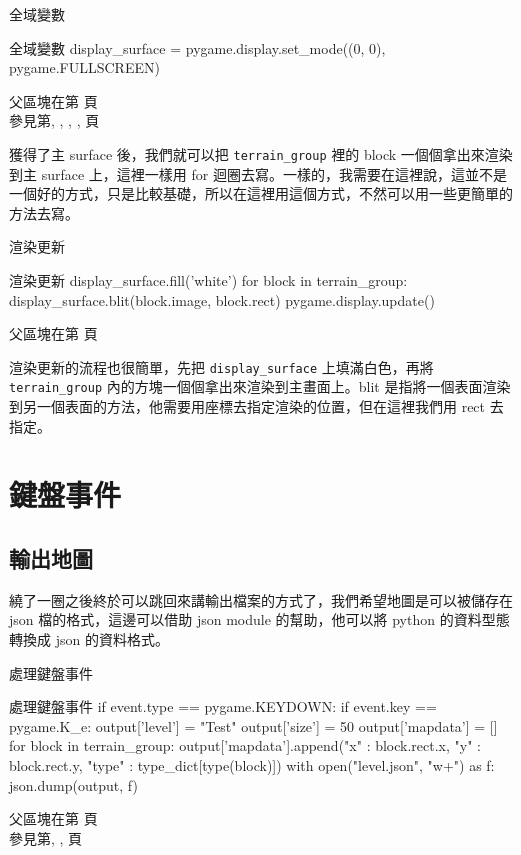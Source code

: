 \documentclass[12pt, a4paper]{siweb}
\begin{document}
\begin{siweb}{全域變數}
\begin{mylisting}{全域變數}
display_surface = pygame.display.set_mode((0, 0), pygame.FULLSCREEN)
\end{mylisting}
\label{全域變數_2}
父區塊在第\pageref{全域變數_father} 頁\\參見第\pageref{全域變數_0}, \pageref{全域變數_1}, \pageref{全域變數_2}, \pageref{全域變數_3}, 頁
\end{siweb}

獲得了主 surface 後，我們就可以把 \verb|terrain_group| 裡的 block 一個個拿出來渲染到主 surface 上，這裡一樣用 for 迴圈去寫。一樣的，我需要在這裡說，這並不是一個好的方式，只是比較基礎，所以在這裡用這個方式，不然可以用一些更簡單的方法去寫。

\begin{siweb}{渲染更新}
\begin{mylisting}{渲染更新}
display_surface.fill('white')
for block in terrain_group:
	display_surface.blit(block.image, block.rect)
pygame.display.update()
\end{mylisting}
\label{渲染更新_0}
父區塊在第\pageref{渲染更新_father} 頁
\end{siweb}

渲染更新的流程也很簡單，先把 \verb|display_surface| 上填滿白色，再將 \verb|terrain_group| 內的方塊一個個拿出來渲染到主畫面上。blit 是指將一個表面渲染到另一個表面的方法，他需要用座標去指定渲染的位置，但在這裡我們用 rect 去指定。

\section{鍵盤事件}

\subsection{輸出地圖}

繞了一圈之後終於可以跳回來講輸出檔案的方式了，我們希望地圖是可以被儲存在 json 檔的格式，這邊可以借助 json module 的幫助，他可以將 python 的資料型態轉換成 json 的資料格式。

\begin{siweb}{處理鍵盤事件}
\begin{mylisting}{處理鍵盤事件}
if event.type == pygame.KEYDOWN:
	if event.key == pygame.K_e:
		output['level'] = "Test"
		output['size'] = 50
		output['mapdata'] = []
		for block in terrain_group:
			output['mapdata'].append({"x" : block.rect.x, "y" : block.rect.y, "type" : type_dict[type(block)]})
		with open("level.json", "w+") as f:
			json.dump(output, f)
\end{mylisting}
\label{處理鍵盤事件_0}
父區塊在第\pageref{處理鍵盤事件_father} 頁\\參見第\pageref{處理鍵盤事件_0}, \pageref{處理鍵盤事件_1}, 頁
\end{siweb}
\end{document}
